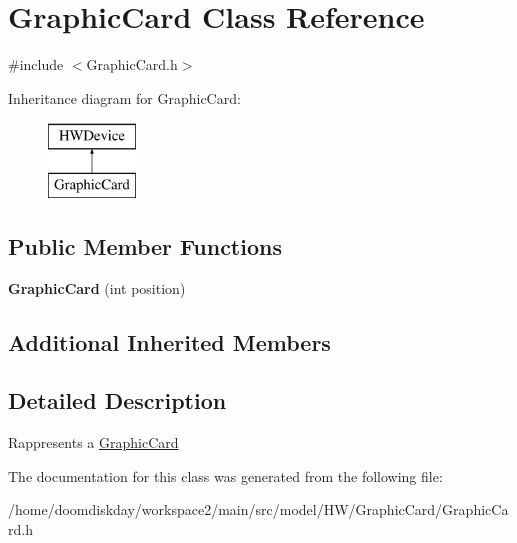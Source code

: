 \hypertarget{classGraphicCard}{}\section{Graphic\+Card Class Reference}
\label{classGraphicCard}


{\ttfamily \#include $<$Graphic\+Card.\+h$>$}

Inheritance diagram for Graphic\+Card\+:\begin{figure}[H]
\begin{center}
\leavevmode
\includegraphics[height=2.000000cm]{classGraphicCard}
\end{center}
\end{figure}
\subsection*{Public Member Functions}
\begin{DoxyCompactItemize}
\item 
{\bfseries Graphic\+Card} (int position)\hypertarget{classGraphicCard_a340281cb1771cdf4006a03e5902fa991}{}\label{classGraphicCard_a340281cb1771cdf4006a03e5902fa991}

\end{DoxyCompactItemize}
\subsection*{Additional Inherited Members}


\subsection{Detailed Description}
Rappresents a \hyperlink{classGraphicCard}{Graphic\+Card} 

The documentation for this class was generated from the following file\+:\begin{DoxyCompactItemize}
\item 
/home/doomdiskday/workspace2/main/src/model/\+H\+W/\+Graphic\+Card/Graphic\+Card.\+h\end{DoxyCompactItemize}
